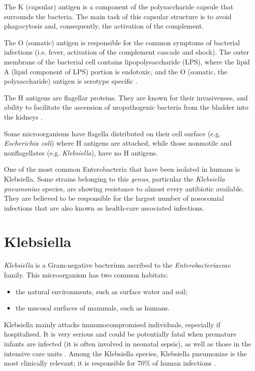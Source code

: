 \documentclass[11pt]{report}
\begin{document}
The K (capsular) antigen is a component of the polysaccharide capsule that surrounds the bacteria.
The main task of this capsular structure is to avoid phagocytosis and, consequently, the activation of the complement.

The O (somatic) antigen is responsible for the common symptoms of bacterial infections (i.e. fever, activation of the complement cascade and shock).
The outer membrane of the bacterial cell contains lipopolysaccharide (LPS), where the lipid A (lipid component of LPS) portion is endotoxic, and the O (somatic, the polysaccharide) antigen is serotype specific \cite{guentzel1996}.

The H antigens are flagellar proteins.
They are known for their invasiveness, and ability to facilitate the ascension of uropathogenic bacteria from the bladder into the kidneys \cite{wiles2008origins}.

Some microorganisms have flagella distributed on their cell surface (e.g. \emph{Escherichia coli}) where H antigens are attached, while those nonmotile and nonflagellates (e.g. \emph{Klebsiella}), have no H antigens.

One of the most common Enterobacteria that have been isolated in humans is Klebsiella.
Some strains belonging to this \emph{genus}, particular the \emph{Klebsiella pneumoniae} species, are showing resistance to almost every antibiotic available.
They are believed to be responsible for the largest number of nosocomial infections that are also known as health-care associated infections.

\clearpage
\section{Klebsiella}
\emph{Klebsiella} is a Gram-negative bacterium ascribed to the \emph{Enterobacteriaceae} family.
This microorganism has two common habitats: 

\begin{itemize}
\item the natural environments, such as surface water and soil;
\item the mucosal surfaces of mammals, such as humans.
\end{itemize}

Klebsiella mainly attacks immunocompromised individuals, especially if hospitalised.
It is very serious and could be potentially fatal when premature infants are infected (it is often involved in neonatal sepsis), as well as those in the intensive care units \cite{podschun1998}.
Among the Klebsiella species, Klebsiella pneumoniae is the most clinically relevant; it is responsible for 70$\%$ of human infections \cite{pitout2015}.
\end{document}
